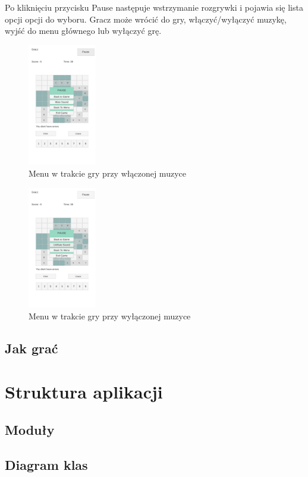 \documentclass[a4paper, 11pt]{article}
\begin{document}
Po kliknięciu przycisku Pause następuje wstrzymanie rozgrywki i pojawia się lista opcji opcji do wyboru. Gracz może wrócić do gry, włączyć/wyłączyć muzykę, wyjść do menu głównego lub wyłączyć grę.
\begin{figure}[H]
	\centering
	\includegraphics[width=3cm]{zrzuty/10.png}
	\caption{Menu w trakcie gry przy włączonej muzyce}
	\label{fig:menu_pause}
\end{figure}
\begin{figure}[H]
	\centering
	\includegraphics[width=3cm]{zrzuty/11.png}
	\caption{Menu w trakcie gry przy wyłączonej muzyce}
	\label{fig:menu_pause2}
\end{figure}

\subsection{Jak grać}



\vfill
	\newpage
\section{Struktura aplikacji}
\subsection{Moduły}
\subsection{Diagram klas}
\end{document}
